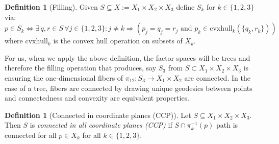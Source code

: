 \documentclass[12pt,parskip=full]{report}
\theoremstyle{plain}
\theoremstyle{definition}
\newtheorem{dfn}[thm]{Definition}
\begin{document}
\begin{dfn}
	[Filling]
	\label{defn:filling}
    Given \(S \subseteq X := X_1\times X_2\times X_3\) define \(S_{k}\) for \(k \in \{1,2,3\}\) via: 
    \[
        p \in S_{k} \iff \exists 
        \,q,r\in S\, \forall j\in \{1,2,3\}: j\neq k 
        \Longrightarrow ( p_{j} = q_{j} = r_{j}
        \text{ and } p_{k} \in \text{cvxhull}_k (\{q_{k} , r_{k}\}))
    \] 
    where \(\text{cvxhull}_k\) is the convex hull operation on subsets of \(X_k\).
\end{dfn}

For us, when we apply the above definition, the factor spaces will be trees and therefore the filling operation that produces, say \(S_3\) from \(S \subset X_1\times X_2\times X_3\) is ensuring the one-dimensional fibers of \(\pi_{12}: S_3\to X_1\times X_2\) are connected. In the case of a tree, fibers are connected by drawing unique geodesics between points and connectedness and convexity are equivalent properties.



\begin{dfn}
[Connected in coordinate planes (CCP)]
    \label{defn:ccp} 
    Let \(S \subseteq X_1\times X_2\times X_3\). Then \(S\) is \emph{connected in all coordinate planes (CCP)} if \(S \cap \pi_{k}^{-1} (p)\) path is connected for all \(p \in X_{k}\) for all \(k\in \{1,2,3\}\).
\end{dfn}
\end{document}
